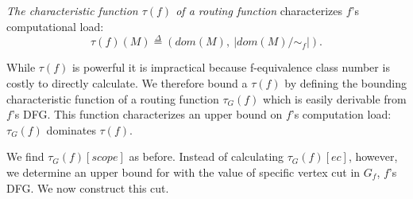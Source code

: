 
\begin{definition} {\em The characteristic function $\tau(f)$ of a routing function} characterizes $f$'s computational load:
\begin{equation*}
\tau(f)(M) \overset{\Delta}{=} (dom(M),\ |dom(M)/\sim_f|).
\end{equation*}
\end{definition}





While $\tau(f)$ is powerful it is impractical because f-equivalence class number is costly to directly calculate. We therefore bound a $\tau(f)$ by defining the bounding characteristic function of a routing function $\tau_G(f)$ which is easily derivable from $f$'s DFG. This function characterizes an upper bound on $f$'s computation load: $\tau_G(f)$ dominates $\tau(f)$.

We find $\tau_G(f)[scope]$ as before. Instead of calculating $\tau_G(f)[ec]$, however, we determine an upper bound for with the value of specific vertex cut in $G_f$, $f$'s DFG. We now construct this cut.


